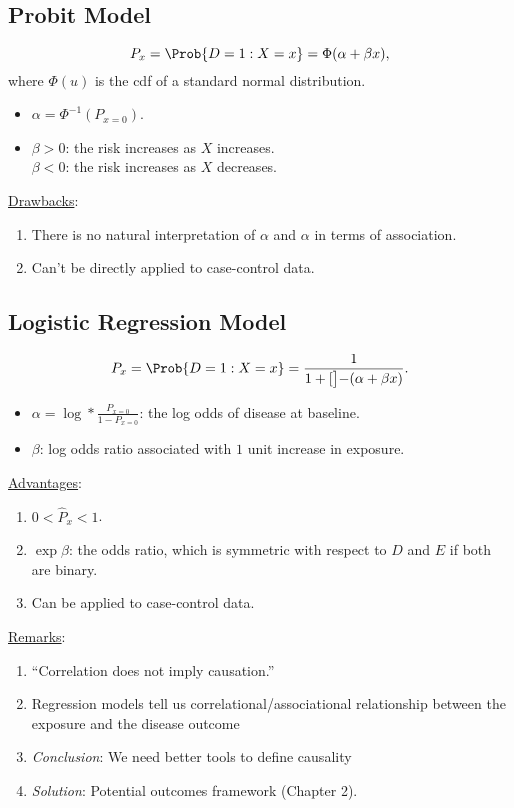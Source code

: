 \subsection{Probit Model}
\begin{Regular}{}
    \[ P_x=\Prob{D=1\given X=x}=\Phi(\alpha+\beta x), \]
    where $ \Phi(u) $ is the cdf of a standard normal distribution.
    \begin{itemize}
        \item $ \alpha=\Phi^{-1}(P_{x=0}) $.
        \item $ \beta>0 $: the risk increases as $ X $ increases.\\
              $ \beta<0 $: the risk increases as $ X $ decreases.
    \end{itemize}
    \tcblower{}
    \underline{Drawbacks}:
    \begin{enumerate}[(1)]
        \item There is no natural interpretation of $ \alpha $ and $ \alpha $ in
              terms of association.
        \item Can't be directly applied to case-control data.
    \end{enumerate}
\end{Regular}
\subsection{Logistic Regression Model}
\begin{Regular}{}
    \[ P_x=\Prob{D=1\given X=x}=\frac{1}{1+\exp[\big]{-(\alpha+\beta x)}}. \]
    \begin{itemize}
        \item $ \displaystyle \alpha=\log*{\frac{P_{x=0}}{1-P_{x=0}}} $: the log odds of disease at baseline.
        \item $ \beta $: log odds ratio associated with $1$ unit increase in exposure.
    \end{itemize}
    \tcblower{}
    \underline{Advantages}:
    \begin{enumerate}[(1)]
        \item $ 0<\hat{P}_x<1 $.
        \item $ \exp{\beta} $: the odds ratio, which is symmetric with respect
              to $ D $ and $ E $ if both are binary.
        \item Can be applied to case-control data.
    \end{enumerate}
\end{Regular}
\underline{Remarks}:
\begin{enumerate}[(1)]
    \item ``Correlation does not imply causation.''
    \item Regression models tell us correlational/associational
          relationship between the exposure and the disease outcome
    \item \emph{Conclusion}: We need better tools to define causality
    \item \emph{Solution}: Potential outcomes framework (Chapter 2).
\end{enumerate}